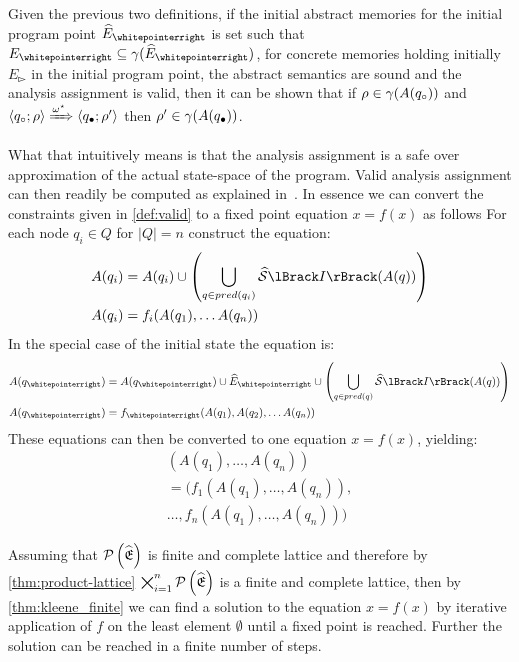 Given the previous two definitions, if the initial abstract memories for the initial program point $\ab{E}_\whitepointerright$ is set such that $E_{\whitepointerright} \subseteq \concrete(\ab{E}_\whitepointerright)$, for concrete memories holding initially $E_{\whitepointerright}$ in the initial program point, the abstract semantics are sound and the analysis assignment is valid, then it can be shown that if $\rho \in \gamma(A(q_\circ))$ and $\langle q_\circ; \rho \rangle \xRightarrow{\omega^\star} \langle q_\bullet; \rho' \rangle$ then $\rho' \in \gamma(A(q_\bullet))$.

What that intuitively means is that the analysis assignment is a safe over approximation of the actual state-space of the program.
Valid analysis assignment can then readily be computed as explained in~\cite{nielson_formal_2019}.
In essence we can convert the constraints given in \autoref{def:valid} to a fixed point equation $x = f(x)$ as follows
For each node $q_i \in Q$ for $|Q| = n$ construct the equation:
\begin{align}
    A(q_i) &= A(q_i) \cup \left(\bigcup_{q \in pred(q_i)} \abssem{I}(A(q))\right) \\
    A(q_i) &= f_i(A(q_1), \dots A(q_n))
\end{align}
In the special case of the initial state the equation is:
\begin{align}
    A(q_\whitepointerright) &= A(q_\whitepointerright) \cup \ab{E}_\whitepointerright \cup  \left(\bigcup_{q \in pred(q)} \abssem{I}(A(q))\right) \\
    A(q_\whitepointerright) &= f_\whitepointerright(A(q_1), A(q_2), \dots A(q_n))
\end{align}
These equations can then be converted to one equation $x = f(x)$, yielding:
\begin{multline}
        (A(q_1), \dots, A(q_n)) \\
        = (f_1(A(q_1), \dots, A(q_n)), \\
        \dots, f_n(A(q_1), \dots, A(q_n)))
\end{multline}

Assuming that $\mathcal{P}\left(\widehat{\mathfrak{E}}\right)$ is finite and complete lattice and therefore by \autoref{thm:product-lattice} $\bigtimes_{i = 1}^n \mathcal{P}\left(\widehat{\mathfrak{E}}\right)$ is a finite and complete lattice, then by \autoref{thm:kleene_finite} we can find a solution to the equation $x = f(x)$ by iterative application of $f$ on the least element $\emptyset$ until a fixed point is reached.
Further the solution can be reached in a finite number of steps.
